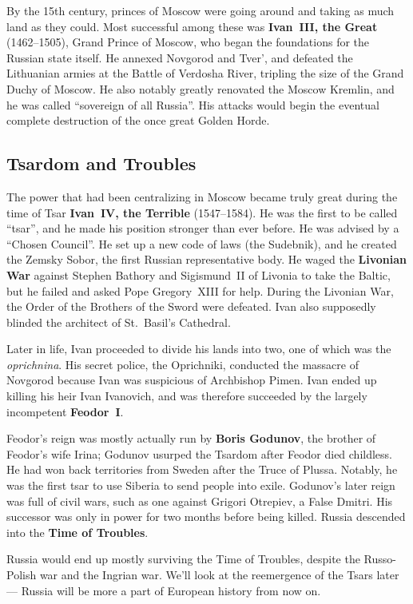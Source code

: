 By the 15th century, princes of Moscow were going around and taking as much land as they could.
Most successful among these was \textbf{Ivan~III, the Great} (1462--1505), Grand Prince of Moscow,
who began the foundations for the Russian state itself.
He annexed Novgorod and Tver', and defeated the Lithuanian armies at the Battle of Verdosha River,
tripling the size of the Grand Duchy of Moscow.
He also notably greatly renovated the Moscow Kremlin, and he was called ``sovereign of all Russia''.
His attacks would begin the eventual complete destruction of the once great Golden Horde.

\subsection*{Tsardom and Troubles}

The power that had been centralizing in Moscow became truly great during the time of
Tsar \textbf{Ivan~IV, the Terrible} (1547--1584).
He was the first to be called ``tsar'', and he made his position stronger than ever before.
He was advised by a ``Chosen Council''.
He set up a new code of laws (the Sudebnik), and he created the Zemsky Sobor, the first Russian representative body.
He waged the \textbf{Livonian War} against Stephen Bathory and Sigismund~II of Livonia to take the Baltic,
but he failed and asked Pope Gregory~XIII for help.
During the Livonian War, the Order of the Brothers of the Sword were defeated.
Ivan also supposedly blinded the architect of St.\ Basil's Cathedral.

Later in life, Ivan proceeded to divide his lands into two, one of which was the \textit{oprichnina}.
His secret police, the Oprichniki,
conducted the massacre of Novgorod because Ivan was suspicious of Archbishop Pimen.
Ivan ended up killing his heir Ivan Ivanovich,
and was therefore succeeded by the largely incompetent \textbf{Feodor~I}.

Feodor's reign was mostly actually run by \textbf{Boris Godunov}, the brother of Feodor's wife Irina;
Godunov usurped the Tsardom after Feodor died childless.
He had won back territories from Sweden after the Truce of Plussa.
Notably, he was the first tsar to use Siberia to send people into exile.
Godunov's later reign was full of civil wars, such as one against Grigori Otrepiev, a False Dmitri.
His successor was only in power for two months before being killed.
Russia descended into the \textbf{Time of Troubles}.

Russia would end up mostly surviving the Time of Troubles, despite the Russo-Polish war and the Ingrian war.
We'll look at the reemergence of the Tsars later --- Russia will be more a part of European history from now on.


